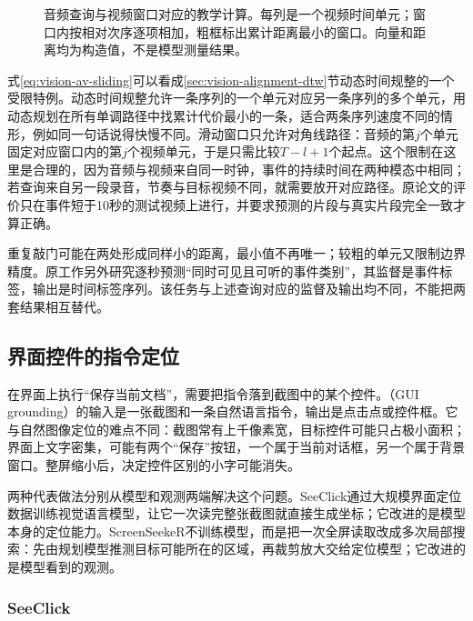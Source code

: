 \begin{figure}[htbp]
  \centering
  
  \caption{音频查询与视频窗口对应的教学计算。每列是一个视频时间单元；窗口内按相对次序逐项相加，粗框标出累计距离最小的窗口。向量和距离均为构造值，不是模型测量结果。}
  \label{fig:vision-av-temporal-match}
\end{figure}
\FloatBarrier

式\eqref{eq:vision-av-sliding}可以看成\ref{sec:vision-alignment-dtw}节动态时间规整的一个受限特例。动态时间规整允许一条序列的一个单元对应另一条序列的多个单元，用动态规划在所有单调路径中找累计代价最小的一条，适合两条序列速度不同的情形，例如同一句话说得快慢不同。滑动窗口只允许对角线路径：音频的第$j$个单元固定对应窗口内的第$j$个视频单元，于是只需比较$T-l+1$个起点。这个限制在这里是合理的，因为音频与视频来自同一时钟，事件的持续时间在两种模态中相同；若查询来自另一段录音，节奏与目标视频不同，就需要放开对应路径。原论文的评价只在事件短于10秒的测试视频上进行，并要求预测的片段与真实片段完全一致才算正确。

重复敲门可能在两处形成同样小的距离，最小值不再唯一；较粗的单元又限制边界精度。原工作另外研究逐秒预测“同时可见且可听的事件类别”，其监督是事件标签，输出是时间标签序列。该任务与上述查询对应的监督及输出均不同，不能把两套结果相互替代。

\subsection{界面控件的指令定位}
\label{sec:vision-understanding-context}

在界面上执行“保存当前文档”，需要把指令落到截图中的某个控件。（GUI grounding）的输入是一张截图和一条自然语言指令，输出是点击点或控件框。它与自然图像定位的难点不同：截图常有上千像素宽，目标控件可能只占极小面积；界面上文字密集，可能有两个“保存”按钮，一个属于当前对话框，另一个属于背景窗口。整屏缩小后，决定控件区别的小字可能消失。

两种代表做法分别从模型和观测两端解决这个问题。SeeClick通过大规模界面定位数据训练视觉语言模型，让它一次读完整张截图就直接生成坐标；它改进的是模型本身的定位能力。ScreenSeekeR不训练模型，而是把一次全屏读取改成多次局部搜索：先由规划模型推测目标可能所在的区域，再裁剪放大交给定位模型；它改进的是模型看到的观测。

\Needspace{60mm}
\subsubsection{SeeClick}
\label{sec:vision-understanding-seeclick}

